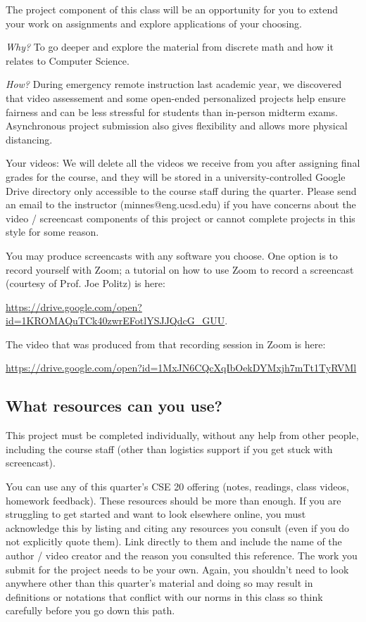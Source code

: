 \documentclass[12pt, oneside]{article}
\begin{document}
\maketitle
\thispagestyle{fancy}
The project component of this class will be an opportunity for you to extend your 
work on assignments and explore applications of your choosing. 

{\it Why?}
To go deeper and explore the material from discrete math and how it relates to Computer Science.

{\it How?} During emergency remote instruction last academic year, we discovered
that video assessement and some open-ended personalized projects help ensure fairness
and can be less stressful for students than in-person midterm exams. Asynchronous project
submission also gives flexibility and allows more physical distancing.

Your videos: We will delete all the videos we receive from you after assigning final grades for the course, 
and they will be stored in a university-controlled Google Drive directory 
only accessible to the course staff during the quarter. 
Please send an email to the instructor (minnes@eng.ucsd.edu) if you have 
concerns about 
the video / screencast components of this project or cannot complete projects in this style for some reason.

You may produce screencasts with any software you choose. 
One option is to record yourself with Zoom; a tutorial on how to use Zoom to record a 
screencast (courtesy of Prof. Joe Politz)  is here: 

\url{https://drive.google.com/open?id=1KROMAQuTCk40zwrEFotlYSJJQdcG_GUU}.

The video that was produced from that recording session in Zoom is here:

\url{https://drive.google.com/open?id=1MxJN6CQcXqIbOekDYMxjh7mTt1TyRVMl}

\subsection*{What resources can you use?}
This project must be completed individually, without any help from other people, 
including the course staff (other than logistics support if you get stuck with screencast). 

You can use any of this quarter's CSE 20 offering (notes, readings, class videos, homework feedback). 
These resources should be more than enough. If you are struggling to get started and want to 
look elsewhere online, you must acknowledge this by listing and citing any resources you consult 
(even if you do not explicitly quote them). Link directly to them and include the name of the 
author / video creator and the reason you consulted this reference. The work you submit for 
the project needs to be your own. Again, you shouldn't need to look anywhere other 
than this quarter's material and doing so may result in definitions or notations 
that conflict with our norms in this class so think carefully before you go down this path.
\end{document}
